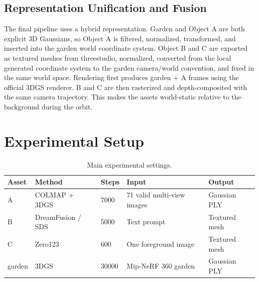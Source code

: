 \documentclass[11pt]{article}
\begin{document}
\subsection{Representation Unification and Fusion}
The final pipeline uses a hybrid representation. Garden and Object A are both explicit 3D Gaussians, so Object A is filtered, normalized, transformed, and inserted into the garden world coordinate system. Object B and C are exported as textured meshes from threestudio, normalized, converted from the local generated coordinate system to the garden camera/world convention, and fixed in the same world space. Rendering first produces garden + A frames using the official 3DGS renderer. B and C are then rasterized and depth-composited with the same camera trajectory. This makes the assets world-static relative to the background during the orbit.

\section{Experimental Setup}
\begin{table}[H]
\centering
\caption{Main experimental settings.}
\begin{tabular}{lllll}
\toprule
Asset & Method & Steps & Input & Output \\
\midrule
A & COLMAP + 3DGS & 7000 & 71 valid multi-view images & Gaussian PLY \\
B & DreamFusion / SDS & 5000 & Text prompt & Textured mesh \\
C & Zero123 & 600 & One foreground image & Textured mesh \\
garden & 3DGS & 30000 & Mip-NeRF 360 garden & Gaussian PLY \\
\bottomrule
\end{tabular}
\end{table}

\begin{table}[H]
\centering
\caption{Hyperparameters and logs.}
\end{table}
\end{document}
